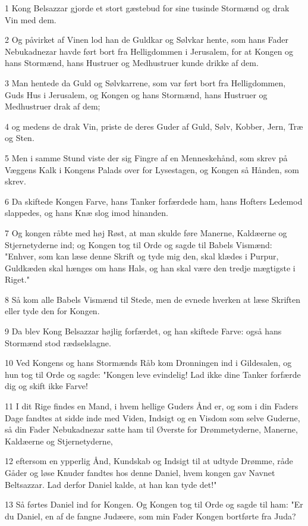\par 1 Kong Belsazzar gjorde et stort gæstebud for sine tusinde Stormænd og drak Vin med dem.
\par 2 Og påvirket af Vinen lod han de Guldkar og Sølvkar hente, som hans Fader Nebukadnezar havde ført bort fra Helligdommen i Jerusalem, for at Kongen og hans Stormænd, hans Hustruer og Medhustruer kunde drikke af dem.
\par 3 Man hentede da Guld og Sølvkarrene, som var ført bort fra Helligdommen, Guds Hus i Jerusalem, og Kongen og hans Stormænd, hans Hustruer og Medhustruer drak af dem;
\par 4 og medens de drak Vin, priste de deres Guder af Guld, Sølv, Kobber, Jern, Træ og Sten.
\par 5 Men i samme Stund viste der sig Fingre af en Menneskehånd, som skrev på Væggens Kalk i Kongens Palads over for Lysestagen, og Kongen så Hånden, som skrev.
\par 6 Da skiftede Kongen Farve, hans Tanker forfærdede ham, hans Hofters Ledemod slappedes, og hans Knæ slog imod hinanden.
\par 7 Og kongen råbte med høj Røst, at man skulde føre Manerne, Kaldæerne og Stjernetyderne ind; og Kongen tog til Orde og sagde til Babels Vismænd: "Enhver, som kan læse denne Skrift og tyde mig den, skal klædes i Purpur, Guldkæden skal hænges om hans Hals, og han skal være den tredje mægtigste i Riget."
\par 8 Så kom alle Babels Vismænd til Stede, men de evnede hverken at læse Skriften eller tyde den for Kongen.
\par 9 Da blev Kong Belsazzar højlig forfærdet, og han skiftede Farve: også hans Stormænd stod rædselslagne.
\par 10 Ved Kongens og hans Stormænds Råb kom Dronningen ind i Gildesalen, og hun tog til Orde og sagde: "Kongen leve evindelig! Lad ikke dine Tanker forfærde dig og skift ikke Farve!
\par 11 I dit Rige findes en Mand, i hvem hellige Guders Ånd er, og som i din Faders Dage fandtes at sidde inde med Viden, Indsigt og en Visdom som selve Guderne, så din Fader Nebukadnezar satte ham til Øverste for Drømmetyderne, Manerne, Kaldæerne og Stjernetyderne,
\par 12 eftersom en ypperlig Ånd, Kundskab og Indsigt til at udtyde Drømme, råde Gåder og løse Knuder fandtes hos denne Daniel, hvem kongen gav Navnet Beltsazzar. Lad derfor Daniel kalde, at han kan tyde det!"
\par 13 Så førtes Daniel ind for Kongen. Og Kongen tog til Orde og sagde til ham: "Er du Daniel, en af de fangne Judæere, som min Fader Kongen bortførte fra Juda?
